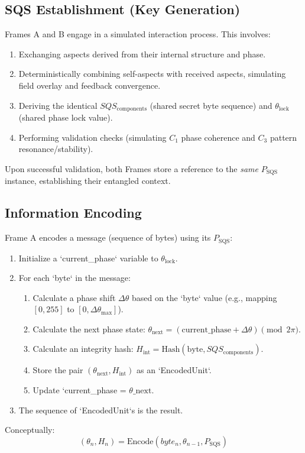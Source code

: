 \documentclass[11pt]{article}
\newcommand{\piConst}{\pi}   %
\newcommand{\SQS}{P_{\text{SQS}}}        %
\newcommand{\SQScomp}{SQS_{\text{components}}} %
\newcommand{\SQSphase}{\theta_{\text{lock}}} %
\newcommand{\IntegHash}{H_{\text{int}}}   %
\begin{document}
	\subsection{SQS Establishment (Key Generation)}
	Frames A and B engage in a simulated interaction process. This involves:
	\begin{enumerate}
		\item Exchanging aspects derived from their internal structure and phase.
		\item Deterministically combining self-aspects with received aspects, simulating field overlay and feedback convergence.
		\item Deriving the identical $\SQScomp$ (shared secret byte sequence) and $\SQSphase$ (shared phase lock value).
		\item Performing validation checks (simulating $C_1$ phase coherence and $C_3$ pattern resonance/stability).
	\end{enumerate}
	Upon successful validation, both Frames store a reference to the \emph{same} $\SQS$ instance, establishing their entangled context.
	
	\subsection{Information Encoding}
	Frame A encodes a message (sequence of bytes) using its $\SQS$:
	\begin{enumerate}
		\item Initialize a `current\_phase` variable to $\SQSphase$.
		\item For each `byte` in the message:
		\begin{enumerate}
			\item Calculate a phase shift $\Delta\theta$ based on the `byte` value (e.g., mapping $[0, 255]$ to $[0, \Delta\theta_{\max}]$).
			\item Calculate the next phase state: $\theta_{\text{next}} = (\text{current\_phase} + \Delta\theta) \pmod{2\piConst}$.
			\item Calculate an integrity hash: $\IntegHash = \text{Hash}(\text{byte}, \SQScomp)$.
			\item Store the pair $(\theta_{\text{next}}, \IntegHash)$ as an `EncodedUnit`.
			\item Update `current\_phase = $\theta\_{\text{next}}$.
		\end{enumerate}
		\item The sequence of `EncodedUnit`s is the result.
	\end{enumerate}
	Conceptually:
	\begin{equation}
		(\theta_{n}, H_n) = \text{Encode}(byte_n, \theta_{n-1}, \SQS)
	\end{equation}
	
\end{document}
